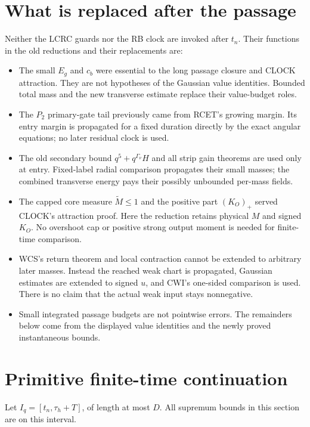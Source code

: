 \documentclass[11pt]{article}
\numberwithin{equation}{section}
\begin{document}
\section{What is replaced after the passage}
\label{an07fwcv1:rangeaudit}
Neither the LCRC guards nor the RB clock are invoked after \(t_n\).
Their functions in the old reductions and their replacements are:
\begin{itemize}
\item The small \(E_g\) and \(c_b\) were essential to the long
 passage closure and CLOCK attraction. They are not hypotheses of
 the Gaussian value identities. Bounded total mass and the new
 transverse estimate replace their value-budget roles.
\item The \(P_2\) primary-gate tail previously came from RCET's
 growing margin. Its entry margin is propagated for a fixed duration
 directly by the exact angular equations; no later residual clock is used.
\item The old secondary bound \(q^5+q^{\Gamma_\nu}H\) and all strip
 gain theorems are used only at entry. Fixed-label radial comparison
 propagates their small masses; the combined transverse energy
 pays their possibly unbounded per-mass fields.
\item The capped core measure \(\widetilde M\le1\) and the positive
 part \((K_O)_+\) served CLOCK's attraction proof. Here the reduction
 retains physical \(M\) and signed \(K_O\). No overshoot cap or
 positive strong output moment is needed for finite-time comparison.
\item WCS's return theorem and local contraction cannot be extended
 to arbitrary later masses. Instead the reached weak chart is
 propagated, Gaussian estimates are extended to signed \(u\),
 and CWI's one-sided comparison is used. There is no claim that
 the actual weak input stays nonnegative.
\item Small integrated passage budgets are not pointwise errors.
 The remainders below come from the displayed value identities
 and the newly proved instantaneous bounds.
\end{itemize}

\section{Primitive finite-time continuation}
\label{an07fwcv1:continuation}
Let \(I_q=[t_n,\tau_h+T]\), of length at most \(D\).
All supremum bounds in this section are on this interval.
\end{document}
